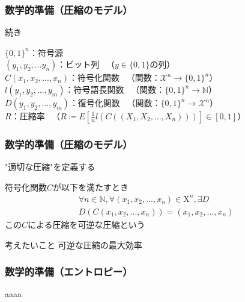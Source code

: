 \documentclass{classes/myslide}
\begin{document}
\begin{frame}\frametitle{数学的準備（圧縮のモデル）}
  続き
  \begin{definition}[]
    $\{0, 1\}^n$：符号源 \\
    $(y_1, y_2,... y_n)$：ビット列 \ （$y \in \{0, 1\}$の列）\\
    $C(x_1, x_2, ..., x_n )$：符号化関数 \ （関数：$\mathcal{X}^n \rightarrow \{0, 1\}^n$）\\
    $l(y_1, y_2, ..., y_m )$：符号語長関数 \ （関数：$\{0, 1\}^n \rightarrow \mathbb{N}$） \\
    $D(y_1, y_2, ..., y_m )$：復号化関数  \ （関数：$\{0, 1\}^n \rightarrow \mathcal{X}^n$） \\
    $R$：圧縮率 \ （$R \coloneq E[\frac{1}{n}l(C((X_1, X_2, ..., X_n)))] \in [0, 1]$）
  \end{definition}
\end{frame}

\begin{frame}\frametitle{数学的準備（圧縮のモデル）}
  "適切な圧縮"を定義する
  \begin{definition}[]
    符号化関数$C$が以下を満たすとき
    \begin{multline*}
      \forall n \in \mathbb{N}, \forall (x_1, x_2, ..., x_n ) \in \mathrm{X}^n, \exists D \\ D(C(x_1, x_2, ..., x_n )) = (x_1, x_2, ..., x_n )
    \end{multline*}
    この$C$による圧縮を可逆な圧縮という
  \end{definition}
  \begin{alertblock}{考えたいこと}
    可逆な圧縮の最大効率
  \end{alertblock}
\end{frame}

\begin{frame}\frametitle{数学的準備（エントロピー）}
  aaaa
\end{frame}
\end{document}
